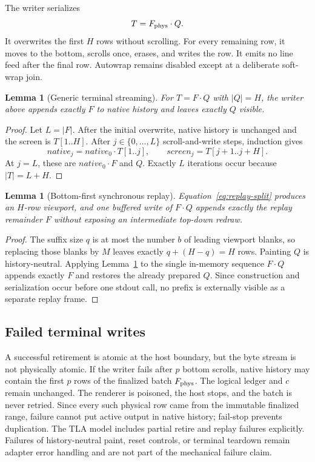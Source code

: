 \documentclass[11pt]{article}
\newtheorem{lemma}[theorem]{Lemma}
\theoremstyle{definition}
\newcommand{\len}[1]{\lvert #1\rvert}
\newcommand{\cat}{\mathbin{\cdot}}
\newcommand{\Native}{\mathit{native}}
\newcommand{\Screen}{\mathit{screen}}
\begin{document}
The writer serializes
\[
  T=F_{\rm phys}\cat Q.
\]
It overwrites the first $H$ rows without scrolling.  For every remaining row,
it moves to the bottom, scrolls once, erases, and writes the row.  It emits no
line feed after the final row.  Autowrap remains disabled except at a deliberate
soft-wrap join.

\begin{lemma}[Generic terminal streaming]
\label{lem:streaming}
For $T=F\cat Q$ with $\len{Q}=H$, the writer above appends exactly $F$ to
native history and leaves exactly $Q$ visible.
\end{lemma}

\begin{proof}
Let $L=\len{F}$.  After the initial overwrite, native history is unchanged and
the screen is $T[1..H]$.  After $j\in\{0,\ldots,L\}$ scroll-and-write steps,
induction gives
\[
  \Native_j=\Native_0\cat T[1..j],
  \qquad
  \Screen_j=T[j+1..j+H].
\]
At $j=L$, these are $\Native_0\cat F$ and $Q$.  Exactly $L$ iterations occur
because $\len{T}=L+H$.
\end{proof}

\begin{lemma}[Bottom-first synchronous replay]
\label{lem:replay}
Equation~\eqref{eq:replay-split} produces an $H$-row viewport, and one
buffered write of $F\cat Q$ appends exactly the replay remainder $F$ without
exposing an intermediate top-down redraw.
\end{lemma}

\begin{proof}
The suffix size $q$ is at most the number $b$ of leading viewport blanks, so
replacing those blanks by $M$ leaves exactly
$q+(H-q)=H$ rows.  Painting $Q$ is history-neutral.  Applying
Lemma~\ref{lem:streaming} to the single in-memory sequence $F\cat Q$ appends
exactly $F$ and restores the already prepared $Q$.  Since construction and
serialization occur before one stdout call, no prefix is externally visible
as a separate replay frame.
\end{proof}

\subsection{Failed terminal writes}

A successful retirement is atomic at the host boundary, but the byte stream is
not physically atomic.  If the writer fails after $p$ bottom scrolls, native
history may contain the first $p$ rows of the finalized batch
$F_{\rm phys}$.  The logical ledger and $c$ remain unchanged.  The renderer is
poisoned, the host stops, and the batch is never retried.  Since every such
physical row came from the immutable finalized range, failure cannot put active output in native history; fail-stop prevents
duplication.  The TLA model includes partial retire and replay failures
explicitly.  Failures of history-neutral paint, reset controls, or terminal
teardown remain adapter error handling and are not part of the mechanical
failure claim.
\end{document}
